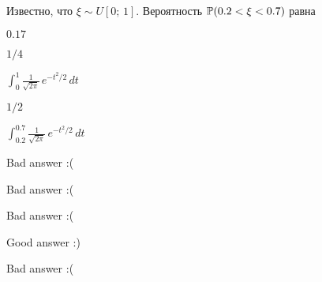 
\begin{question}
Известно, что \(\xi \sim U[0;\,1]\). Вероятность \(\P(0.2<\xi<0.7)\)
равна
\begin{answerlist}
  \item \(0.17\)
  \item \(1/4\)
  \item \(\int_{0}^{1}\frac{1}{\sqrt{2\pi}}\,e^{-t^2/2}\,dt\)
  \item \(1/2\)
  \item \(\int_{0.2}^{0.7}\frac{1}{\sqrt{2\pi}}\,e^{-t^2/2}\,dt\)
\end{answerlist}
\end{question}

\begin{solution}
\begin{answerlist}
  \item Bad answer :(
  \item Bad answer :(
  \item Bad answer :(
  \item Good answer :)
  \item Bad answer :(
\end{answerlist}
\end{solution}

